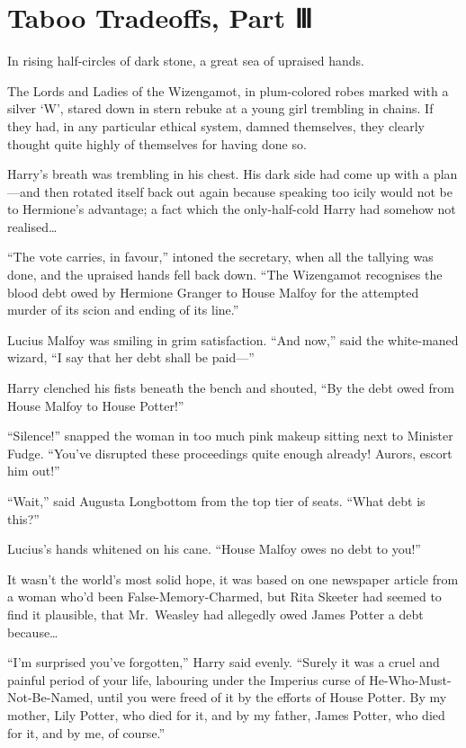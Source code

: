 \chapter{Taboo Tradeoffs, Part Ⅲ}

In rising half-circles of dark stone, a great sea of upraised hands.

The Lords and Ladies of the Wizengamot, in plum-colored robes marked
with a silver `W', stared down in stern rebuke at a young girl trembling
in chains. If they had, in any particular ethical system, damned
themselves, they clearly thought quite highly of themselves for having
done so.

Harry's breath was trembling in his chest. His dark side had come up
with a plan---and then rotated itself back out again because speaking
too icily would not be to Hermione's advantage; a fact which the
only-half-cold Harry had somehow not realised\ldots{}

``The vote carries, in favour,'' intoned the secretary, when all the
tallying was done, and the upraised hands fell back down. ``The
Wizengamot recognises the blood debt owed by Hermione Granger to House
Malfoy for the attempted murder of its scion and ending of its line.''

Lucius Malfoy was smiling in grim satisfaction. ``And now,'' said the
white-maned wizard, ``I say that her debt shall be paid---''

Harry clenched his fists beneath the bench and shouted, ``By the debt
owed from House Malfoy to House Potter!''

``Silence!'' snapped the woman in too much pink makeup sitting next to
Minister Fudge. ``You've disrupted these proceedings quite enough
already! Aurors, escort him out!''

``Wait,'' said Augusta Longbottom from the top tier of seats. ``What
debt is this?''

Lucius's hands whitened on his cane. ``House Malfoy owes no debt to
you!''

It wasn't the world's most solid hope, it was based on one newspaper
article from a woman who'd been False-Memory-Charmed, but Rita Skeeter
had seemed to find it plausible, that Mr.~Weasley had allegedly owed
James Potter a debt because\ldots{}

``I'm surprised you've forgotten,'' Harry said evenly. ``Surely it was a
cruel and painful period of your life, labouring under the Imperius
curse of He-Who-Must-Not-Be-Named, until you were freed of it by the
efforts of House Potter. By my mother, Lily Potter, who died for it, and
by my father, James Potter, who died for it, and by me, of course.''

